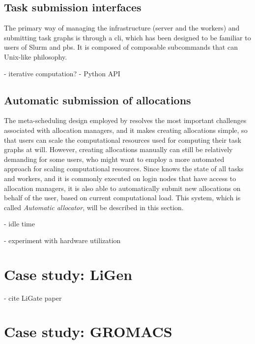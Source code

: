 \subsection{Task submission interfaces}
The primary way of managing the \hyperqueue{} infrastructure (server and the workers)
and submitting task graphs is through a \gls{cli}, which has been designed to be familiar
to users of Slurm and \gls{pbs}. It is composed of composable subcommands that can
Unix-like philosophy.



- iterative computation?
- Python API


\subsection{Automatic submission of allocations}
The meta-scheduling design employed by \hyperqueue{} resolves the most important
challenges associated with allocation managers, and it makes creating allocations simple, so that
users can scale the computational resources used for computing their task graphs at will. However,
creating allocations manually can still be relatively demanding for some users, who might want to
employ a more automated approach for scaling computational resources. Since \hyperqueue{}
knows the state of all tasks and workers, and it is commonly executed on login nodes that have
access to allocation managers, it is also able to automatically submit new allocations on behalf of
the user, based on current computational load. This system, which is called
\emph{Automatic allocator}, will be described in this section.

- idle time


- experiment with hardware utilization

\section{Case study: LiGen}
- cite LiGate paper

\section{Case study: GROMACS}

